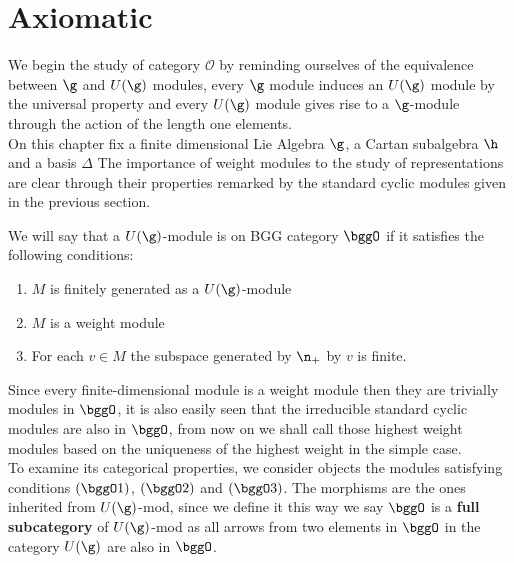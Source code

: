 \section{Axiomatic}
We begin the study of category $\mathcal{O}$ by reminding ourselves of the equivalence between $\g$ and $U(\g)$ modules, every $\g$ module induces an $U(\g)$ module by the universal property and every $U(\g)$ module gives rise to a $\g$-module through the action of the length one elements.\\
On this chapter fix a finite dimensional Lie Algebra $\g$, a Cartan subalgebra $\h$ and a basis $\Delta$
The importance of weight modules to the study of representations are clear through their properties remarked by the standard cyclic modules given in the previous section.\\
\begin{defi}
We will say that a $U(\g)$-module is on BGG category $\bggO$ if it satisfies the following conditions:
\begin{enumerate}[label=($\bggO$\arabic*)]
	\item $M$ is finitely generated as a $U(\g)$-module
	\item $M$ is a weight module
	\item For each $v \in M$ the subspace generated by $\n_+$ by $v$ is finite.
\end{enumerate}
\end{defi}
Since every finite-dimensional module is a weight module then they are trivially modules in $\bggO$, it is also easily seen that the irreducible standard cyclic modules are also in $\bggO$, from now on we shall call those highest weight modules based on the uniqueness of the highest weight in the simple case.\\
To examine its categorical properties, we consider objects the modules satisfying conditions $(\bggO1)$, $(\bggO2)$ and $(\bggO3)$. The morphisms are the ones inherited from $U(\g)$-mod, since we define it this way we say $\bggO$ is a \textbf{full subcategory} of $U(\g)$-mod as all arrows from two elements in $\bggO$ in the category $U(\g)$ are also in $\bggO$.\\
 